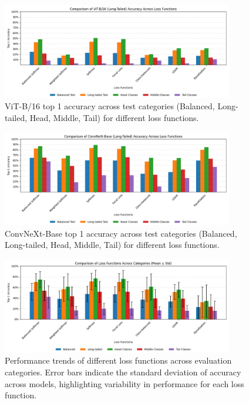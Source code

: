 \begin{figure}[h!]
    \centering
    \includegraphics[width=0.9\textwidth]{Images/Plots/vit_lt_loss_comparison.png}
    \caption{ViT-B/16 top 1 accuracy across test categories (Balanced, Long-tailed, Head, Middle, Tail) for different loss functions.}
    \label{fig:vit_lt_loss_comparison}
\end{figure}
\FloatBarrier

\begin{figure}[h!]
    \centering
    \includegraphics[width=0.9\textwidth]{Images/Plots/convnext_lt_loss_comparison.png}
    \caption{ConvNeXt-Base top 1 accuracy across test categories (Balanced, Long-tailed, Head, Middle, Tail) for different loss functions.}
    \label{fig:conv_lt_loss_comparison}
\end{figure}
\FloatBarrier


\begin{figure}[h!]
    \centering
    \includegraphics[width=0.9\textwidth]{Images/Plots/loss_function_bar_plot_mean_std.png}
    \caption{Performance trends of different loss functions across evaluation categories. Error bars indicate the standard deviation of accuracy across models, highlighting variability in performance for each loss function.}
    \label{fig:loss_comparison_bars}
\end{figure}
\FloatBarrier


